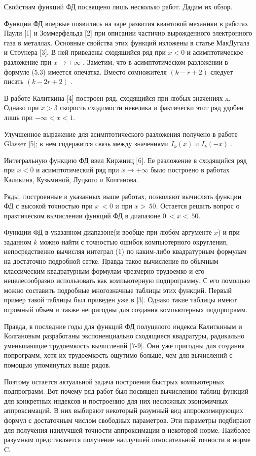 Свойствам функций ФД посвящено лишь несколько работ. Дадим их обзор.

Функции ФД впервые появились на заре развития квантовой механики в работах Паули [1] и Зоммерфельда [2] при описании частично вырожденного электронного газа в металлах. Основные свойства этих функций изложены в статье МакДугала и Стоунера [3]. В ней приведены сходящийся ряд при $x < 0$ и
асимптотическое разложение при $x \to +\infty$ . Заметим, что в асимптотическом разложении в формуле (5.3) имеется опечатка. Вместо сомножителя $(k - r + 2)$ следует писать $(k - 2r + 2)$ .

В работе Калиткина [4] построен ряд, сходящийся при любых значениях x. Однако при $x > 3$ скорость сходимости невелика и фактически этот ряд удобен лишь при $-\infty < x < 1$.

Улучшенное выражение для асимптотического разложения получено в работе Glasser [5]; в нем содержится связь между значениями  $I_k(x)$ и $I_k(-x)$ .

Интегральную функцию ФД ввел Киржниц [6]. Ее разложение в сходящийся ряд при $x < 0$  и асимптотический ряд при $x \to +\infty$ было построено в работах Каликина, Кузьминой, Луцкого и Колганова.

Ряды, построенные в указанных выше работах, позволяют вычислять функции ФД с высокой точностью при $x ~< 0$ и при $x >~ 50$. Остается решить вопрос о практическом вычислении функций ФД в диапазоне $0 ~<x <~ 50$.

Функции ФД в указанном диапазоне(и вообще при любом аргументе $x$) и при заданном $k$ можно найти с
точностью ошибок компьютерного округления, непосредственно вычисляя
интеграл (1) по каким-либо квадратурным формулам на достаточно
подробной сетке. Правда такое вычисление по обычным классическим квадратурным формулам чрезмерно трудоемко и его нецелесообразно использовать как компьютерную подпрограмму. С его помощью можно составить подробные многозначные таблицы этих функций. Первый пример такой таблицы был приведен уже в [3]. Однако такие таблицы имеют огромный объем и также
непригодны для создания компьютерных
подпрограмм.

Правда, в последние годы для функций ФД полуцелого индекса Калиткиным и Колгановым разработаны экспоненциально сходящиеся квадратуры, радикально уменьшающие трудоемкость вычислений [7-9]. Они уже пригодны для создания попрограмм, хотя их трудоемкость ощутимо больше, чем для вычислений с помощью упомянутых выше рядов.

Поэтому остается актуальной задача построения быстрых компьютерных подпрограмм. Вот почему
ряд работ был посвящен вычислению таблиц функций для конкретных
индексов и построению для них несложных экономичных аппроксимаций. В них выбирают некоторый
разумный вид аппроксимирующих формул с достаточным числом свободных
параметров. Эти параметры подбирают для получения наилучшей
точности аппроксимации в некоторой норме. Наиболее разумным
представляется получение наилучшей относительной точности в норме C.

